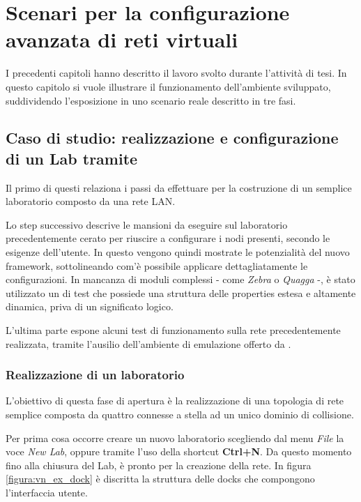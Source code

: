 \chapter{Scenari per la configurazione avanzata di reti virtuali}\label{capitolo:esempi}

I precedenti capitoli hanno descritto il lavoro svolto durante l'attività di tesi. In questo capitolo si vuole illustrare il funzionamento dell'ambiente sviluppato, suddividendo l'esposizione in uno scenario reale descritto in tre fasi.


\section{Caso di studio: realizzazione e configurazione di un Lab tramite \visualnetkit{}}
Il primo di questi relaziona i passi da effettuare per la costruzione di un semplice laboratorio composto da una rete LAN.

Lo step successivo descrive le mansioni da eseguire sul laboratorio precedentemente cerato per riuscire a configurare i nodi presenti, secondo le esigenze dell'utente. In questo vengono quindi mostrate le potenzialità del nuovo \plugin{} framework, sottolineando com'è possibile applicare dettagliatamente le configurazioni. In mancanza di moduli complessi - come \emph{Zebra} o \emph{Quagga} -, è stato utilizzato un \plugin{} di test che possiede una struttura delle properties estesa e altamente dinamica, priva di un significato logico.

L'ultima parte espone alcuni test di funzionamento sulla rete precedentemente realizzata, tramite l'ausilio dell'ambiente di emulazione offerto da \netkit{}.

\subsection{Realizzazione di un laboratorio}
L'obiettivo di questa fase di apertura è la realizzazione di una topologia di rete semplice composta da quattro \virtualmachine{} connesse a stella ad un unico dominio di collisione.

Per prima cosa occorre creare un nuovo laboratorio scegliendo dal menu \emph{File} la voce \emph{New Lab}, oppure tramite l'uso della shortcut \textbf{Ctrl+N}. Da questo momento fino alla chiusura del Lab, \visualnetkit{} è pronto per la creazione della rete. In figura \ref{figura:vn_ex_dock} è discritta la struttura delle docks che compongono l'interfaccia utente.

